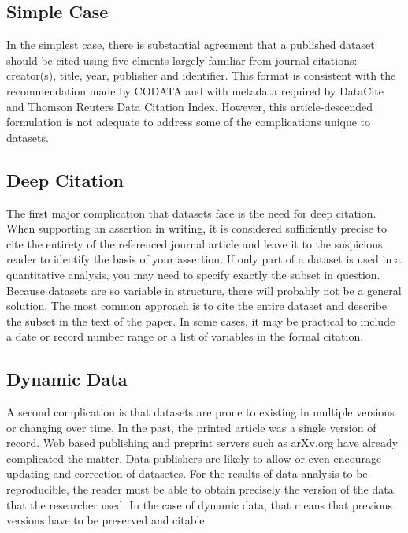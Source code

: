 \documentclass[10pt,a4paper,twocolumn]{article}
\begin{document}
\subsection*{Simple Case}\label{simple-case}

In the simplest case, there is substantial agreement that a published dataset should be cited using five elments largely familiar from journal citations: creator(s), title, year, publisher and identifier. 
This format is consistent with the recommendation made by CODATA\cite{socha_out_2013} and with metadata required by DataCite \cite{datacite_datacite_2013} and Thomson Reuters Data Citation Index. However, this article-descended formulation is not adequate to address some of the complications unique to datasets.

\subsection*{Deep Citation}\label{deep-citation}

The first major complication that datasets face is the need for deep citation. 
When supporting an assertion in writing, it is considered sufficiently precise to cite the entirety of the referenced journal article and leave it to the suspicious reader to identify the basis of your assertion. 
If only part of a dataset is used in a quantitative analysis, you may need to specify exactly the subset in question. 
Because datasets are so variable in structure, there will probably not be a general solution. 
The most common approach is to cite the entire dataset and describe the subset in the text of the paper. 
In some cases, it may be practical to include a date or record number range or a list of variables in the formal citation.

\subsection*{Dynamic Data}\label{dynamic-data}

A second complication is that datasets are prone to existing in multiple versions or changing over time. 
In the past, the printed article was a single version of record.
Web based publishing and preprint servers such as arXv.org have already complicated the matter. 
Data publishers are likely to allow or even encourage updating and correction of datasetes. 
For the results of data analysis to be reproducible, the reader must be able to obtain precisely the version of the data that the researcher used. 
In the case of dynamic data, that means that previous versions have to be preserved and citable.
\end{document}
